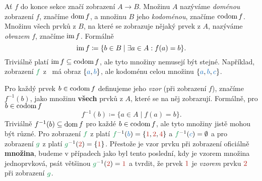 Ať $f$ do konce sekce značí zobrazení $A \to B$. Množinu $A$ nazýváme
\emph{doménou} zobrazení $f$, značíme $\operatorname{dom} f$, a množinu $B$ jeho
\emph{kodoménou}, značíme $\operatorname{codom} f$. Množinu všech prvků z $B$, na které se
zobrazuje nějaký prvek z $A$, nazýváme \emph{obrazem} $f$, značíme $\operatorname{im} f$.
Formálně
\[
 \operatorname{im} f \coloneqq \{b \in B \mid \exists a \in A: f(a) = b\}.
\]
Triviálně platí $\operatorname{im} f \subseteq \operatorname{codom} f$, ale tyto množiny nemusejí být
stejné. Například, zobrazení $\clg{f}$
z~ má obraz $\{\clb{a},\clb{b}\}$,
ale kodoménu celou množinu $\{\clb{a},\clb{b},\clb{c}\}$.

Pro každý prvek $b \in \operatorname{codom} f$ definujeme jeho \emph{vzor} (při zobrazení
$f$), značíme $f^{-1}(b)$, jako množinu \textbf{všech} prvků z $A$, které se na
něj zobrazují. Formálně, pro $b \in \operatorname{codom} f$
\[
 f^{-1}(b) \coloneqq \{a \in A \mid f(a) = b\}.
\]
Triviálně $f^{-1}(b) \subseteq \operatorname{dom} f$ pro každé $b \in \operatorname{codom} f$, ale tyto
množiny jistě mohou být různé. Pro zobrazení $\clg{f}$ z
 platí $\clg{f}^{-1}(\clb{b}) =
\{\clr{1},\clr{2},\clr{4}\}$ a $\clg{f}^{-1}(\clb{c})=\emptyset$ a pro zobrazení
$\clg{g}$ z  platí
$\clg{g}^{-1}(\clr{2}) = \{\clr{1}\}$. Přestože je vzor prvku při zobrazení
oficiálně \textbf{množina}, budeme v případech jako byl tento poslední, kdy je
vzorem množina jednoprvková, psát většinou $\clg{g}^{-1}(\clr{2}) = \clr{1}$ a
tvrdit, že prvek $\clr{1}$ je \emph{vzorem} prvku $\clr{2}$ při zobrazení
$\clg{g}$.

